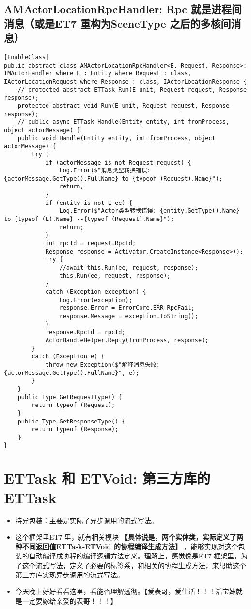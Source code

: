 \documentclass[9pt, b5paper]{article}
\begin{document}
\subsection{AMActorLocationRpcHandler: Rpc 就是进程间消息（或是ET7 重构为SceneType 之后的多核间消息）}
\label{sec-10-5}
\begin{verbatim}
[EnableClass]
public abstract class AMActorLocationRpcHandler<E, Request, Response>: IMActorHandler where E : Entity where Request : class, IActorLocationRequest where Response : class, IActorLocationResponse {
    // protected abstract ETTask Run(E unit, Request request, Response response);
    protected abstract void Run(E unit, Request request, Response response);
    // public async ETTask Handle(Entity entity, int fromProcess, object actorMessage) {
    public void Handle(Entity entity, int fromProcess, object actorMessage) {
        try {
            if (actorMessage is not Request request) {
                Log.Error($"消息类型转换错误: {actorMessage.GetType().FullName} to {typeof (Request).Name}");
                return;
            }
            if (entity is not E ee) {
                Log.Error($"Actor类型转换错误: {entity.GetType().Name} to {typeof (E).Name} --{typeof (Request).Name}");
                return;
            }
            int rpcId = request.RpcId;
            Response response = Activator.CreateInstance<Response>();
            try {
                //await this.Run(ee, request, response);
                this.Run(ee, request, response);
            }
            catch (Exception exception) {
                Log.Error(exception);
                response.Error = ErrorCore.ERR_RpcFail;
                response.Message = exception.ToString();
            }
            response.RpcId = rpcId;
            ActorHandleHelper.Reply(fromProcess, response);
        }
        catch (Exception e) {
            throw new Exception($"解释消息失败: {actorMessage.GetType().FullName}", e);
        }
    }
    public Type GetRequestType() {
        return typeof (Request);
    }
    public Type GetResponseType() {
        return typeof (Response);
    }
}
\end{verbatim}


\section{ETTask 和 ETVoid: 第三方库的ETTask}
\label{sec-11}
\begin{itemize}
\item 特异包装：主要是实际了异步调用的流式写法。
\item 这个框架里ET7 里，就有相关模块 \textbf{【具体说是，两个实体类，实际定义了两种不同返回值ETTask-ETVoid 的协程编译生成方法】} ，能够实现对这个包装的自动编译成协程的编译逻辑方法定义。理解上，感觉像是ET7 框架里，为了这个流式写法，定义了必要的标签系，和相关的协程生成方法，来帮助这个第三方库实现异步调用的流式写法。
\item 今天晚上好好看看这里，看能否理解透彻。【爱表哥，爱生活！！！活宝妹就是一定要嫁给亲爱的表哥！！！】
\end{itemize}
\end{document}
